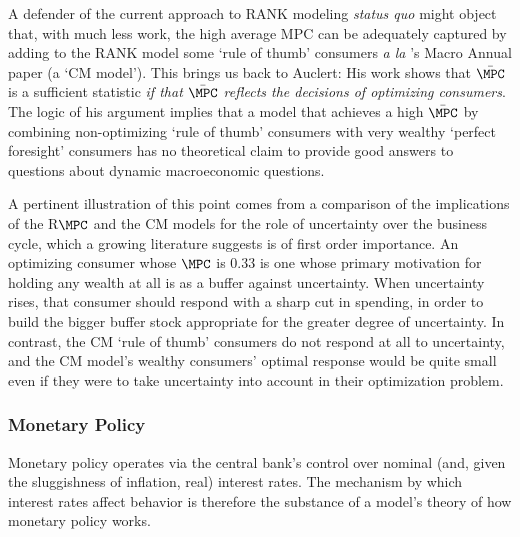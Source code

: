 \documentclass[titlepage]{econtex}
\begin{document}
A defender of the current approach to RANK modeling {\it status quo} might object that, with much less work, the high average MPC can be adequately captured by adding to the RANK model some `rule of thumb' consumers {\it a la} \cite{cmModel}'s Macro Annual paper (a `CM model').  This brings us back to Auclert:  His work shows that $\bar{\MPC}$ is a sufficient statistic {\it if that $\bar{\MPC}$ reflects the decisions of optimizing consumers}.  The logic of his argument implies that a model that achieves a high $\bar{\MPC}$ by combining non-optimizing `rule of thumb' consumers with very wealthy `perfect foresight' consumers has no theoretical claim to provide good answers to questions about dynamic macroeconomic questions.

A pertinent illustration of this point comes from a comparison of the implications of the R$\MPC$ and the CM models for the role of uncertainty over the business cycle, which a growing literature suggests is of first order importance.  An optimizing consumer whose $\MPC$ is 0.33 is one whose primary motivation for holding any wealth at all is as a buffer against uncertainty.  When uncertainty rises, that consumer should respond with a sharp cut in spending, in order to build the bigger buffer stock appropriate for the greater degree of uncertainty.  In contrast, the CM `rule of thumb' consumers do not respond at all to uncertainty, and the CM model's wealthy consumers' optimal response would be quite small even if they were to take uncertainty into account in their optimization problem.

\subsubsection{Monetary Policy}

Monetary policy operates via the central bank's control over nominal (and, given the sluggishness of inflation, real) interest rates.  The mechanism by which interest rates affect behavior is therefore the substance of a model's theory of how monetary policy works.
\end{document}

